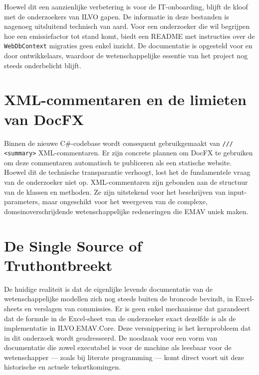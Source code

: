 Hoewel dit een aanzienlijke verbetering is voor de IT-onboarding, blijft de kloof met de onderzoekers van ILVO gapen. De informatie in deze bestanden is nagenoeg uitsluitend technisch van aard. Voor een onderzoeker die wil begrijpen hoe een emissiefactor tot stand komt, biedt een README met instructies over de \texttt{WebDbContext} migraties geen enkel inzicht. De documentatie is opgesteld voor en door ontwikkelaars, waardoor de wetenschappelijke essentie van het project nog steeds onderbelicht blijft.

\section{XML-commentaren en de limieten van DocFX}
Binnen de nieuwe C\#-codebase wordt consequent gebruikgemaakt van \texttt{/// <summary>} XML-commentaren. Er zijn concrete plannen om DocFX te gebruiken om deze commentaren automatisch te publiceren als een statische website. Hoewel dit de technische transparantie verhoogt, lost het de fundamentele vraag van de onderzoeker niet op. XML-commentaren zijn gebonden aan de structuur van de klassen en methoden. Ze zijn uitstekend voor het beschrijven van input-parameters, maar ongeschikt voor het weergeven van de complexe, domeinoverschrijdende wetenschappelijke redeneringen die EMAV uniek maken.

\section{De \textquotedbl Single Source of Truth\textquotedbl \@ ontbreekt}
De huidige realiteit is dat de eigenlijke levende documentatie van de wetenschappelijke modellen zich nog steeds buiten de broncode bevindt, in Excel-sheets en verslagen van commissies. Er is geen enkel mechanisme dat garandeert dat de formule in de Excel-sheet van de onderzoeker exact dezelfde is als de implementatie in ILVO.EMAV.Core. Deze versnippering is het kernprobleem dat in dit onderzoek wordt geadresseerd. De noodzaak voor een vorm van documentatie die zowel executabel is voor de machine als leesbaar voor de wetenschapper — zoals bij literate programming — komt direct voort uit deze historische en actuele tekortkomingen.
